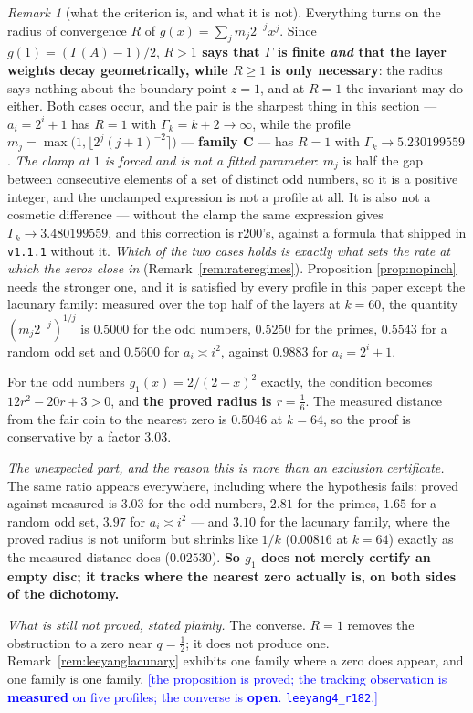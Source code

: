 \documentclass[11pt,a4paper]{article}
\theoremstyle{plain}
\theoremstyle{definition}
\theoremstyle{remark}
\newtheorem{remark}[theorem]{Remark}
\newcommand{\STATUS}[1]{\textcolor{blue}{\textsf{[#1]}}}
\begin{document}
\begin{remark}[what the criterion is, and what it is not]\label{rem:nopinchreading}
Everything turns on the radius of convergence $R$ of $g(x)=\sum_j m_j2^{-j}x^{j}$. Since
$g(1)=(\Gamma(A)-1)/2$, \textbf{$R>1$ says that $\Gamma$ is finite \emph{and} that the layer
weights decay geometrically, while $R\ge1$ is only necessary}: the radius says nothing about the
boundary point $z=1$, and at $R=1$ the invariant may do either. Both cases occur, and the pair is
the sharpest thing in this section --- $a_i=2^{i}+1$ has $R=1$ with $\Gamma_k=k+2\to\infty$,
while the profile $m_j=\max\bigl(1,\lfloor2^{j}(j+1)^{-2}\rceil\bigr)$ --- \textbf{family C} ---
has $R=1$ with $\Gamma_k\to5.230199559$. \emph{The clamp at $1$ is forced and is not a fitted
parameter}: $m_j$ is half the gap between consecutive elements of a set of distinct odd numbers,
so it is a positive integer, and the unclamped expression is not a profile at all. It is also
not a cosmetic difference --- without the clamp the same expression gives
$\Gamma_k\to3.480199559$, and this correction is r200's, against a formula that shipped in
\texttt{v1.1.1} without it. \emph{Which of the two cases holds is exactly what sets the rate at
which the zeros close in} (Remark~\ref{rem:rateregimes}). Proposition
\ref{prop:nopinch} needs the stronger one, and it is satisfied by every profile in this paper
except the lacunary family: measured over the top half of the layers at $k=60$, the quantity
$(m_j2^{-j})^{1/j}$ is $0.5000$ for the odd numbers, $0.5250$ for the primes, $0.5543$ for a
random odd set and $0.5600$ for $a_i\asymp i^{2}$, against $0.9883$ for $a_i=2^{i}+1$.

For the odd numbers $g_1(x)=2/(2-x)^{2}$ exactly, the condition becomes $12r^{2}-20r+3>0$, and
\textbf{the proved radius is $r=\tfrac16$}. The measured distance from the fair coin to the
nearest zero is $0.5046$ at $k=64$, so the proof is conservative by a factor $3.03$.

\emph{The unexpected part, and the reason this is more than an exclusion certificate.} The same
ratio appears everywhere, including where the hypothesis fails: proved against measured is
$3.03$ for the odd numbers, $2.81$ for the primes, $1.65$ for a random odd set, $3.97$ for
$a_i\asymp i^{2}$ --- and $3.10$ for the lacunary family, where the proved radius is not uniform
but shrinks like $1/k$ ($0.00816$ at $k=64$) exactly as the measured distance does
($0.02530$). \textbf{So $g_1$ does not merely certify an empty disc; it tracks where the nearest
zero actually is, on both sides of the dichotomy.}

\emph{What is still not proved, stated plainly.} The converse. $R=1$ removes the obstruction to
a zero near $q=\tfrac12$; it does not produce one. Remark~\ref{rem:leeyanglacunary} exhibits one
family where a zero does appear, and one family is one family.
\STATUS{the proposition is proved; the tracking observation is \textbf{measured} on five
profiles; the converse is \textbf{open}. \texttt{leeyang4\_r182}.}
\end{remark}
\end{document}
